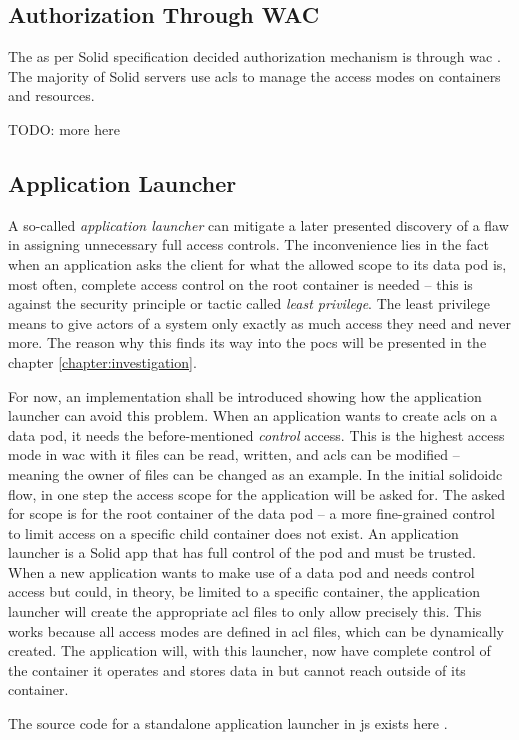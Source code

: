 \subsection{Authorization Through WAC}

The as per Solid specification decided authorization mechanism is through \gls{wac} \cite{wac}. The majority of Solid servers use \glspl{acl} to manage the access modes on containers and resources.

TODO: more here

\subsection{Application Launcher}

A so-called \textit{application launcher} can mitigate a later presented discovery of a flaw in assigning unnecessary full access controls. The inconvenience lies in the fact when an application asks the client for what the allowed scope to its data pod is, most often, complete access control on the root container is needed -- this is against the security principle or tactic called \textit{least privilege}. The least privilege means to give actors of a system only exactly as much access they need and never more. The reason why this finds its way into the \glspl{poc} will be presented in the chapter \ref{chapter:investigation}.

For now, an implementation shall be introduced showing how the application launcher can avoid this problem. When an application wants to create \glspl{acl} on a data pod, it needs the before-mentioned \textit{control} access. This is the highest access mode in \gls{wac} with it files can be read, written, and \glspl{acl} can be modified -- meaning the owner of files can be changed as an example.
In the initial \gls{solidoidc} flow, in one step the access scope for the application will be asked for. The asked for scope is for the root container of the data pod -- a more fine-grained control to limit access on a specific child container does not exist. An application launcher is a Solid app that has full control of the pod and must be trusted. When a new application wants to make use of a data pod and needs control access but could, in theory, be limited to a specific container, the application launcher will create the appropriate \gls{acl} files to only allow precisely this.
This works because all access modes are defined in \gls{acl} files, which can be dynamically created. The application will, with this launcher, now have complete control of the container it operates and stores data in but cannot reach outside of its container.

The source code for a standalone application launcher in \gls{js} exists here \cite{app-launcher}.
